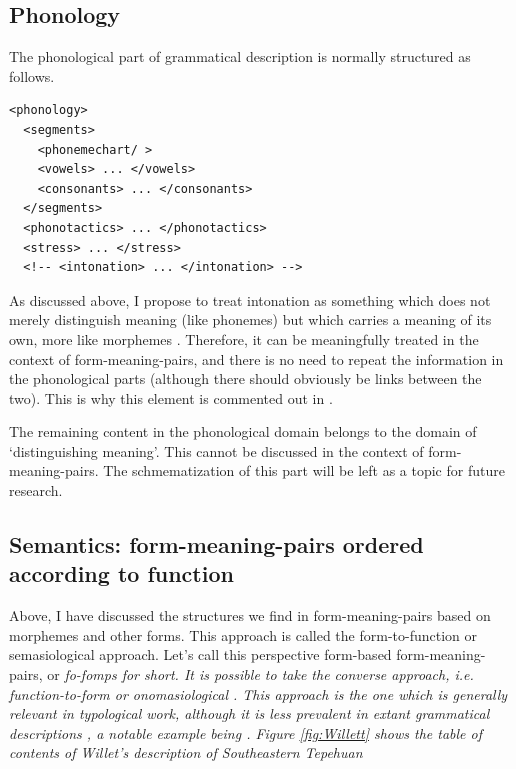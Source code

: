 \documentclass[a4paper,12pt]{article}
\begin{document}
\subsection{Phonology}
The phonological part of grammatical description is normally structured as follows.

\ea\label{xml:phonology}
\begin{verbatim} 
<phonology>
  <segments>
    <phonemechart/ >
    <vowels> ... </vowels>
    <consonants> ... </consonants>
  </segments>
  <phonotactics> ... </phonotactics>
  <stress> ... </stress>
  <!-- <intonation> ... </intonation> -->
\end{verbatim}
\z

As discussed above, I propose to treat intonation as something which does not merely distinguish meaning (like phonemes) but which carries a meaning of its own, more like morphemes \citep[cf.][]{Mosel2006craft}.  Therefore, it can be meaningfully treated in the context of form-meaning-pairs, and there is no need to repeat the information in the phonological parts (although there should obviously be links between the two). This is why this element is commented out in .

The remaining content in the phonological domain belongs to the domain of `distinguishing meaning'. This cannot be discussed in the context of form-meaning-pairs. The schmematization of this part will be left as a topic for future research.
 
\subsection{Semantics: form-meaning-pairs ordered according to function}
Above, I have discussed the structures we find in form-meaning-pairs based on morphemes and other forms.  This approach is called the form-to-function or semasiological approach. Let's call this perspective form-based form-meaning-pairs, or \em fo-fomps \em for short. It is possible to take the converse approach, i.e. function-to-form or onomasiological \citep{Gabelentz1891,Jespersen1924}. This approach is the one which is generally relevant in typological work, although it is less prevalent in extant grammatical descriptions \citep{Lehmann1980,
Comrie1998,
Lehmann1998,Lehmann2004funkt,
SchultzeBerndt1998,
Cristofaro2006,
Mosel2006craft,
Payne2006,
Zaefferer2006}, a notable example being \citep{Willett1991}. Figure \ref{fig:Willett} shows the table of contents of Willet's description of Southeastern Tepehuan
\end{document}

